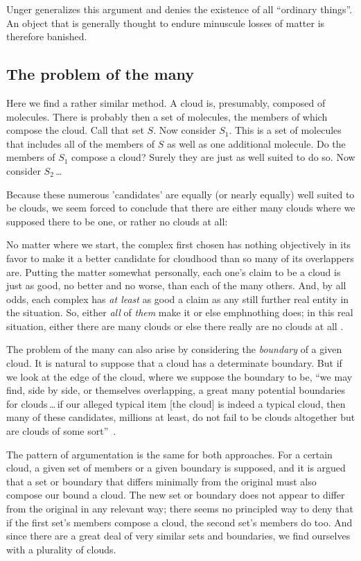 \documentclass[11pt]{article}
\newenvironment{squote}{%
\begin{spacing}{1}
       	\begin{list}{}{%
\setlength{\labelwidth}{0pt}%
\rightmargin\leftmargin%
}
\item\relax
}{%
\end{list}%
\end{spacing}
}
\begin{document}
\begin{spacing}{1.5}
Unger generalizes this argument and denies the existence of all
``ordinary things''.  An object that is generally thought to endure
minuscule losses of matter is therefore banished.

\subsection{The problem of the many}
Here we find a rather similar method.  A cloud is, presumably,
composed of molecules.  There is probably then a set of molecules, the
members of which compose the cloud.  Call that set $S$.  Now consider
$S_1$.  This is a set of molecules that includes all of the members of
$S$ as well as one additional molecule.  Do the members of $S_1$
compose a cloud?  Surely they are just as well suited to do so.  Now
consider $S_2$\,\ldots

Because these numerous 'candidates' are equally (or nearly equally)
well suited to be clouds, we seem forced to conclude that there are
either many clouds where we supposed there to be one, or rather no
clouds at all:

\begin{squote}
No matter where we start, the complex first chosen has nothing
objectively in its favor to make it a better candidate for cloudhood
than so many of its overlappers are.  Putting the matter somewhat
personally, each one's claim to be a cloud is just as good, no better
and no worse, than each of the many others.  And, by all odds, each
complex has \emph{at least} as good a claim as any still further real
entity in the situation.  So, either \emph{all} of \emph{them} make it or else
emph{nothing} does; in this real situation, either there are many clouds
or else there really are no clouds at all \citep[415--??]{unger1980a}.
\end{squote}

The problem of the many can also arise by considering the {\em
  boundary} of a given cloud.  It is natural to suppose that a cloud
has a determinate boundary.  But if we look at the edge of the cloud,
where we suppose the boundary to be, ``we may find, side by side, or
themselves overlapping, a great many potential boundaries for
clouds\,\ldots\,if our alleged typical item {[}the cloud{]} is indeed
a typical cloud, then many of these candidates, millions at least, do
not fail to be clouds altogether but are clouds of some
sort''~\citep[420--421]{unger1980a}.

The pattern of argumentation is the same for both approaches.  For a
certain cloud, a given set of members or a given boundary is supposed,
and it is argued that a set or boundary that differs minimally from
the original must also compose our bound a cloud.  The new set or
boundary does not appear to differ from the original in any relevant
way; there seems no principled way to deny that if the first set's
members compose a cloud, the second set's members do too.  And since
there are a great deal of very similar sets and boundaries, we find
ourselves with a plurality of clouds.


\end{spacing}
\end{document}
